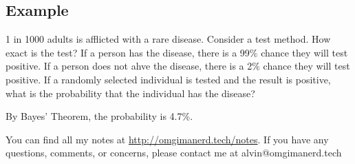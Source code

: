 \documentclass{math}
\begin{document}
\subsection*{Example}
1 in 1000 adults is afflicted with a rare disease. Consider a test method. How
exact is the test? If a person has the disease, there is a 99\% chance they will
test positive. If a person does not ahve the disease, there is a 2\% chance they
will test positive. If a randomly selected individual is tested and the result
is positive, what is the probability that the individual has the disease? \par
By Bayes' Theorem, the probability is 4.7\%.

\begin{center}
  You can find all my notes at \url{http://omgimanerd.tech/notes}. If you have
  any questions, comments, or concerns, please contact me at
  alvin@omgimanerd.tech
\end{center}
\end{document}
